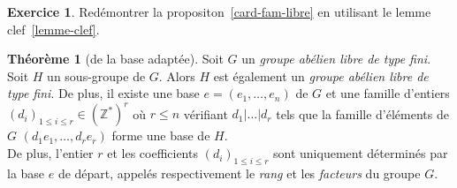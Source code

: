 \documentclass{report}
\newcommand{\Z}{\mathbb{Z}}
\theoremstyle{definition}
\newtheorem{theo}[defi]{Théorème}
\newtheorem{exo}[defi]{Exercice}
\begin{document}
\begin{exo}
Red\'emontrer la propositon~\ref{card-fam-libre} en utilisant le lemme clef~\ref{lemme-clef}.
\end{exo}

\begin{theo}[de la base adaptée]
Soit $G$ un \textit{groupe abélien libre de type fini}. Soit $H$ un sous-groupe de $G$. Alors $H$ est également un \textit{groupe abélien libre de type fini}.
De plus, il existe une base $e=(e_1, \ldots, e_n)$ de $G$ et une famille d'entiers $(d_i)_{1 \leqslant i \leqslant r} \in (\Z^*)^r$ où $r \leqslant n$ vérifiant
$d_1 \vert \ldots \vert d_r$ tels que la famille d'éléments de $G$ $(d_1e_1, \ldots, d_re_r)$ forme une base de $H$.\\
De plus, l'entier $r$ et les coefficients $(d_i)_{1 \leqslant i \leqslant r}$ sont uniquement déterminés par la base $e$ de départ, appelés respectivement le \textit{rang} et les \textit{facteurs} du groupe $G$.
\end{theo}
\end{document}
